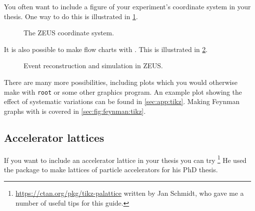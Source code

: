 You often want to include a figure of your experiment's coordinate
system in your thesis. One way to do this is illustrated in
\cref{fig:tikz:coord}.

\begin{figure}[htbp]
  \centering
  
  \caption{The ZEUS coordinate system.}%
  \label{fig:tikz:coord}
\end{figure}

It is also possible to make flow charts with \TikZ.
This is illustrated in \cref{fig:tikz:flow}.

\begin{figure}[htbp]
  \centering
  
  \caption[Event reconstruction and simulation in ZEUS]{Event reconstruction and simulation in ZEUS.}%
  \label{fig:tikz:flow}
\end{figure}

There are many more possibilities,
including plots which you would otherwise make with \texttt{root} or
some other graphics program. An example plot showing the effect of
systematic variations can be found in \cref{sec:app:tikz}. Making
Feynman graphs with \TikZ is covered in \cref{sec:fig:feynman:tikz}.


\subsection{Accelerator lattices}%
\label{sec:fig:accelerator}

If you want to include an accelerator lattice in your thesis you can try
\footnote{%
  \url{https://ctan.org/pkg/tikz-palattice}
written by Jan Schmidt, who gave me a number of useful tips for this guide.}
He used the package to make lattices of particle accelerators for his PhD thesis.

